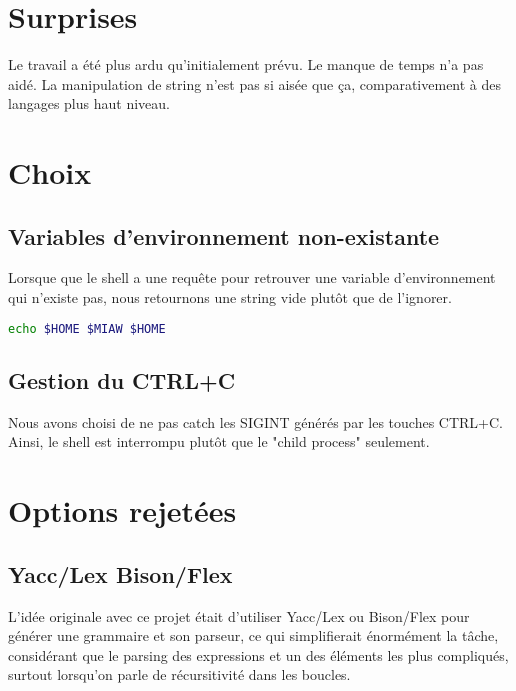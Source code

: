 \documentclass[a4paper]{article}
\begin{document}
\section*{Surprises}
    Le travail a été plus ardu qu'initialement prévu.
    Le manque de temps n'a pas aidé.
    La manipulation de string n'est pas si aisée que ça, comparativement à des
    langages plus haut niveau.

\section*{Choix}
    \subsection*{Variables d'environnement non-existante}
    Lorsque que le shell a une requ\^ete pour retrouver une variable
    d'environnement qui n'existe pas, nous retournons une string vide plut\^ot
    que de l'ignorer.
        \begin{lstlisting}[language=bash]
echo $HOME $MIAW $HOME
        \end{lstlisting}

    \subsection*{Gestion du CTRL+C}
        Nous avons choisi de ne pas catch les SIGINT g\'en\'er\'es par les touches CTRL+C. Ainsi, le shell est 
        interrompu plut\^ot que le "child process" seulement.

\section*{Options rejet\'ees}
    \subsection*{Yacc/Lex Bison/Flex}
    L'idée originale avec ce projet était d'utiliser Yacc/Lex ou Bison/Flex pour
    générer une grammaire et son parseur, ce qui simplifierait énormément la tâche,
    considérant que le parsing des expressions et un des éléments les plus compliqués,
    surtout lorsqu'on parle de récursitivité dans les boucles.
\end{document}
